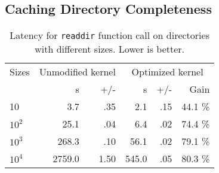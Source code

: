 


\subsection{Caching Directory Completeness}

\begin{table}[t]
\scriptsize
\centering
\begin{tabular}{|l|rr|rrr|}
\hline
Sizes & \multicolumn{2}{c|}{Unmodified kernel} & \multicolumn{3}{c|}{Optimized kernel} \\
& s & +/- & s & +/- & Gain\\
\hline
10 & 3.7 & .35 & 2.1 & .15 & 44.1 \% \\
\hline
$10^2$ & 25.1 & .04 & 6.4 & .02 & 74.4 \% \\
\hline
$10^3$ & 268.3 & .10 & 56.1 & .02 & 79.1 \% \\
\hline
$10^4$ & 2759.0 & 1.50 & 545.0 & .05 & 80.3 \% \\
\hline
\end{tabular}
\caption{Latency for {\tt readdir} function call on directories with different sizes. Lower is better.}
\label{table:readdir-microbench}
\end{table}

